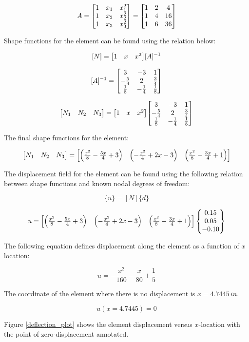 \documentclass[../main.tex]{subfiles}
\begin{document}
\[
    A = \mqty[
        1 & x_1 & x_1^2\\
        1 & x_2 & x_2^2\\
        1 & x_3 & x_3^2
    ]
    =
    \mqty[
        1 & 2 & 4\\
        1 & 4 & 16 \\
        1 & 6 & 36
    ]
\]

Shape functions for the element can be found using the relation below:

\[
    [N] = \mqty[1 & x & x^2][A]^{-1}
\]

\[
    [A]^{-1} = 
    \mqty[
        3 & -3 & 1\\
        -\frac{5}{4} & 2 & \frac{3}{4}\\
        \frac{1}{8} & -\frac{1}{4} & \frac{1}{8}
    ]
\]

\[
    \mqty[N_1 & N_2 & N_3] = \mqty[1 & x & x^2] \mqty[
        3 & -3 & 1\\
        -\frac{5}{4} & 2 & \frac{3}{4}\\
        \frac{1}{8} & -\frac{1}{4} & \frac{1}{8}
    ]
\]

The final shape functions for the element:

\[
    \mqty[N_1 & N_2 & N_3] = \mqty[\left({\frac{x^2}{8}-\frac{5x}{4}+ 3}\right) & \left({-\frac{x^2}{4}+2x-3}\right) & \left({\frac{x^2}{8}-\frac{3x}{4}+1}\right)]
\]

The displacement field for the element can be found using the following relation between shape functions and known nodal degrees of freedom:

\[
    \{u\} = [N]\{d\}
\]

\[
    u =  \mqty[\left({\frac{x^2}{8}-\frac{5x}{4}+ 3}\right) & \left({-\frac{x^2}{4}+2x-3}\right) & \left({\frac{x^2}{8}-\frac{3x}{4}+1}\right)] 
    \begin{Bmatrix}
        0.15 \\ 0.05 \\ -0.10
    \end{Bmatrix}
\]

The following equation defines displacement along the element as a function of \(x\) location:

\[
    u = -\frac{x^2}{160} - \frac{x}{80} + \frac{1}{5}
\]

The coordinate of the element where there is no displacement is \(x=4.7445\,\unit{in}\).

\[
    \boxed{
    u(x=4.7445) = 0
    }
\]

Figure \ref{deflection_plot} shows the element displacement versus \(x\)-location with the point of zero-displacement annotated.
\end{document}
